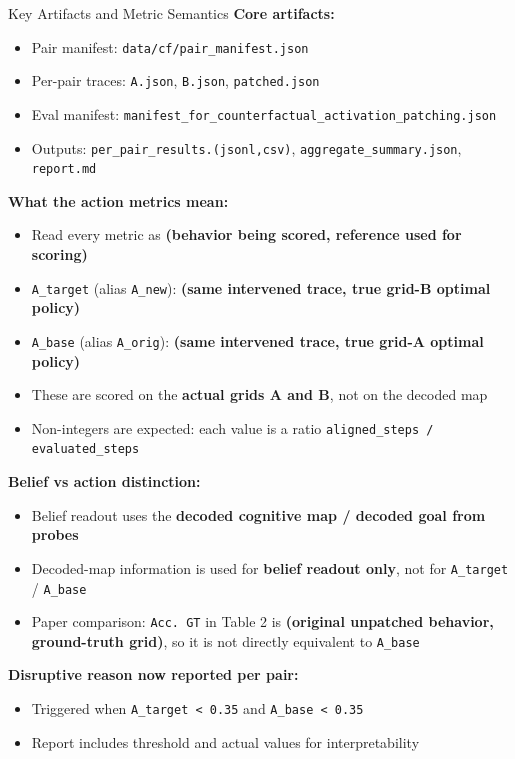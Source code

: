 \documentclass[aspectratio=169]{beamer}
\begin{document}
\begin{frame}{Key Artifacts and Metric Semantics}
\textbf{Core artifacts:}
\begin{itemize}
  \item Pair manifest: \texttt{data/cf/pair\_manifest.json}
  \item Per-pair traces: \texttt{A.json}, \texttt{B.json}, \texttt{patched.json}
  \item Eval manifest: \texttt{manifest\_for\_counterfactual\_activation\_patching.json}
  \item Outputs: \texttt{per\_pair\_results.(jsonl,csv)}, \texttt{aggregate\_summary.json}, \texttt{report.md}
\end{itemize}

\vspace{0.4em}
\textbf{What the action metrics mean:}
\begin{itemize}
  \item Read every metric as \textbf{(behavior being scored, reference used for scoring)}
  \item \texttt{A\_target} (alias \texttt{A\_new}): \textbf{(same intervened trace, true grid-B optimal policy)}
  \item \texttt{A\_base} (alias \texttt{A\_orig}): \textbf{(same intervened trace, true grid-A optimal policy)}
  \item These are scored on the \textbf{actual grids A and B}, not on the decoded map
  \item Non-integers are expected: each value is a ratio \texttt{aligned\_steps / evaluated\_steps}
\end{itemize}

\vspace{0.4em}
\textbf{Belief vs action distinction:}
\begin{itemize}
  \item Belief readout uses the \textbf{decoded cognitive map / decoded goal from probes}
  \item Decoded-map information is used for \textbf{belief readout only}, not for \texttt{A\_target} / \texttt{A\_base}
  \item Paper comparison: \texttt{Acc. GT} in Table 2 is \textbf{(original unpatched behavior, ground-truth grid)}, so it is not directly equivalent to \texttt{A\_base}
\end{itemize}

\vspace{0.4em}
\textbf{Disruptive reason now reported per pair:}
\begin{itemize}
  \item Triggered when \texttt{A\_target < 0.35} and \texttt{A\_base < 0.35}
  \item Report includes threshold and actual values for interpretability
\end{itemize}
\end{frame}
\end{document}
